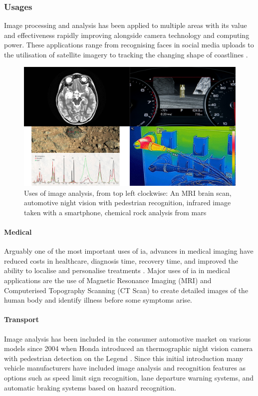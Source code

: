 	\subsubsection{Usages}
	Image processing and analysis has been applied to multiple areas with its value and 
	effectiveness rapidly improving alongside camera technology and computing power. These 
	applications range from recognising faces in social media uploads \citep{zuckerberg2011tagging} 
	to the utilisation of satellite imagery to tracking the changing shape of coastlines 
	\citep{costalimagery}.
	\begin{figure}[h!]
		\centering
		\includegraphics[width=15cm]{../images/4panel.png}
		\caption{Uses of image analysis, from top left clockwise: An MRI brain scan, automotive 
		night vision with pedestrian recognition, infrared image taken with a smartphone, chemical 
		rock analysis from 
			mars}
		\label{fig:curiosity}
	\end{figure}
	\paragraph{Medical}
	Arguably one of the most important uses of \gls{ia}, advances in medical imaging have reduced costs in healthcare, diagnosis time, recovery time, and improved the ability to localise and personalise treatments \citep{esfmedical}. Major uses of \gls{ia} in medical applications are the use of Magnetic Resonance Imaging (MRI) and Computerised Topography Scanning (CT Scan) to create detailed images of the human body and identify illness before some symptoms arise.
	\paragraph{Transport}
	Image analysis has been included in the consumer automotive market on various models since 2004 when Honda introduced an thermographic night vision camera with pedestrian detection on the Legend  \citep{hondanightvision}. Since this initial introduction many vehicle manufacturers have included image analysis and recognition features as options such as speed limit sign recognition, lane departure warning systems, and automatic braking systems based on hazard recognition.
